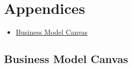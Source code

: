 %
%
%

\section{Appendices}
	\label{sec:appendices}

\begin{itemize}
	\item \hyperref[subsec:appendices:business-model-canvas]{Business Model Canvas}
\end{itemize}

\subsection{Business Model Canvas}
	\label{subsec:appendices:business-model-canvas}


\clearpage